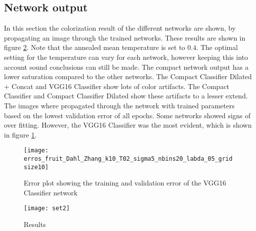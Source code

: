 \subsection{Network output}
In this section the colorization result of the different networks are shown, by propagating an image through the trained networks. These results are shown in figure \ref{fig:results}. Note that the annealed mean temperature is set to $0.4$. The optimal setting for the temperature can vary for each network, however keeping this into account sound conclusions can still be made. The compact network output has a lower saturation compared to the other networks. The Compact Classifier Dilated + Concat and VGG16 Classifier show lots of color artifacts. The Compact Classifier and Compact Classifier Dilated show these artifacts to a lesser extend. The images where propagated through the network with trained parameters based on the lowest validation error of all epochs. Some networks showed signs of over fitting. However, the VGG16 Classifier was the most evident, which is shown in figure \ref{fig:overfit}.
\begin{figure}[h!]
	\centering
	\texttt{[image: erros\_fruit\_Dahl\_Zhang\_k10\_T02\_sigma5\_nbins20\_labda\_05\_gridsize10]}
	\caption{Error plot showing the training and validation error of the VGG16 Classifier network}
	\label{fig:overfit}
\end{figure}

\clearpage
\begin{figure}[h!]
	\centering
	\texttt{[image: set2]}
	\caption{Results}
	\label{fig:results}
\end{figure}




